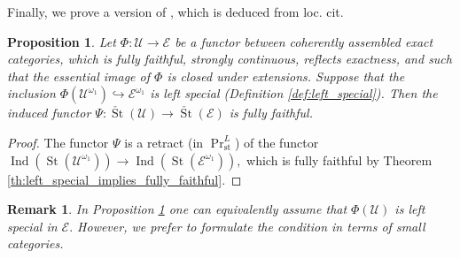 \documentclass[11pt,leqno]{amsart}
\newtheorem{prop}[theo]{Proposition}
\newtheorem{remark}[theo]{Remark}
\numberwithin{equation}{section}
\def\Hom{\operatorname{Hom}}
\newcommand{\hto}{\hookrightarrow}
\newcommand{\Cone}{\operatorname{Cone}}
\newcommand{\St}{\operatorname{St}}
\newcommand{\st}{\operatorname{st}}
\newcommand{\cC}{{\mathcal C}}
\newcommand{\cE}{{\mathcal E}}
\newcommand{\cU}{{\mathcal U}}
\newcommand{\Ext}{\operatorname{Ext}}
\newcommand{\Sp}{\operatorname{Sp}}
\newcommand{\Ind}{\operatorname{Ind}}
\begin{document}
Finally, we prove a version of \cite[Theorem 4.5]{SW26}, which is deduced from loc. cit.

\begin{prop}\label{prop:left_special_coherently_assembled}
Let $\Phi:\cU\to\cE$ be a functor between coherently assembled exact categories, which is fully faithful, strongly continuous, reflects exactness, and such that the essential image of $\Phi$ is closed under extensions. Suppose that the inclusion $\Phi(\cU^{\omega_1})\hto \cE^{\omega_1}$ is left special (Definition \ref{def:left_special}). Then the induced functor $\Psi:\check{\St}(\cU)\to\check{\St}(\cE)$ is fully faithful.
\end{prop}

\begin{proof}
The functor $\Psi$ is a retract (in $\Pr^L_{\st}$) of the functor $\Ind(\St(\cU^{\omega_1}))\to\Ind(\St(\cE^{\omega_1})),$ which is fully faithful by Theorem \ref{th:left_special_implies_fully_faithful}.
\end{proof}

\begin{remark}
In Proposition \ref{prop:left_special_coherently_assembled} one can equivalently assume that $\Phi(\cU)$ is left special in $\cE.$ However, we prefer to formulate the condition in terms of small categories.
\end{remark}


\end{document}
